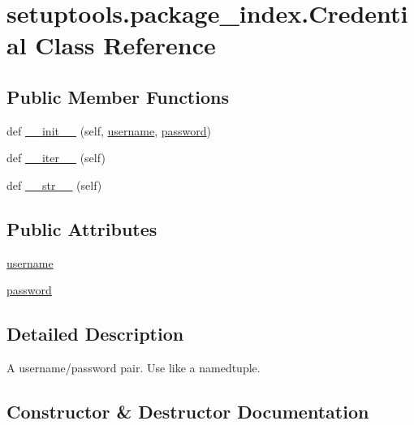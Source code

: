 \hypertarget{classsetuptools_1_1package__index_1_1Credential}{}\section{setuptools.\+package\+\_\+index.\+Credential Class Reference}
\label{classsetuptools_1_1package__index_1_1Credential}
\subsection*{Public Member Functions}
\begin{DoxyCompactItemize}
\item 
def \hyperlink{classsetuptools_1_1package__index_1_1Credential_aa8da15130e5f0f03652fa5e8210c4dfc}{\+\_\+\+\_\+init\+\_\+\+\_\+} (self, \hyperlink{classsetuptools_1_1package__index_1_1Credential_a6a7a5161bf18e7b62175a4a5a13413c4}{username}, \hyperlink{classsetuptools_1_1package__index_1_1Credential_a5780ce49e865131209546a5f7d1020d6}{password})
\item 
def \hyperlink{classsetuptools_1_1package__index_1_1Credential_a8be8a44a724193a68706677c188e3a23}{\+\_\+\+\_\+iter\+\_\+\+\_\+} (self)
\item 
def \hyperlink{classsetuptools_1_1package__index_1_1Credential_ac755b797fe6d3aa9659f1754e1ae6644}{\+\_\+\+\_\+str\+\_\+\+\_\+} (self)
\end{DoxyCompactItemize}
\subsection*{Public Attributes}
\begin{DoxyCompactItemize}
\item 
\hyperlink{classsetuptools_1_1package__index_1_1Credential_a6a7a5161bf18e7b62175a4a5a13413c4}{username}
\item 
\hyperlink{classsetuptools_1_1package__index_1_1Credential_a5780ce49e865131209546a5f7d1020d6}{password}
\end{DoxyCompactItemize}


\subsection{Detailed Description}
\begin{DoxyVerb}A username/password pair. Use like a namedtuple.
\end{DoxyVerb}
 

\subsection{Constructor \& Destructor Documentation}
\mbox{\label{classsetuptools_1_1package__index_1_1Credential_aa8da15130e5f0f03652fa5e8210c4dfc}} 
